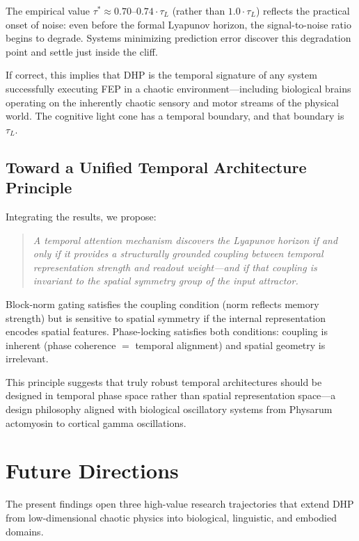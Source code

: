 \documentclass[12pt]{article}
\theoremstyle{definition}
\begin{document}
The empirical value $\tau^* \approx 0.70\text{--}0.74 \cdot \tau_L$ (rather than
$1.0 \cdot \tau_L$) reflects the practical onset of noise: even before the formal
Lyapunov horizon, the signal-to-noise ratio begins to degrade. Systems minimizing
prediction error discover this degradation point and settle just inside the cliff.

If correct, this implies that DHP is the temporal signature of any system
successfully executing FEP in a chaotic environment---including biological brains
operating on the inherently chaotic sensory and motor streams of the physical world.
The cognitive light cone \citep{levin2019cognitive} has a temporal boundary, and that
boundary is $\tau_L$.

\subsection{Toward a Unified Temporal Architecture Principle}

Integrating the results, we propose:

\begin{quote}
\textit{A temporal attention mechanism discovers the Lyapunov horizon if and only
if it provides a structurally grounded coupling between temporal representation
strength and readout weight---and if that coupling is invariant to the spatial symmetry
group of the input attractor.}
\end{quote}

Block-norm gating satisfies the coupling condition (norm reflects memory strength)
but is sensitive to spatial symmetry if the internal representation encodes spatial
features. Phase-locking satisfies both conditions: coupling is inherent (phase coherence
$=$ temporal alignment) and spatial geometry is irrelevant.

This principle suggests that truly robust temporal architectures should be designed
in temporal phase space rather than spatial representation space---a design philosophy
aligned with biological oscillatory systems from Physarum actomyosin to cortical
gamma oscillations.

\section{Future Directions}

The present findings open three high-value research trajectories that extend DHP from
low-dimensional chaotic physics into biological, linguistic, and embodied domains.
\end{document}
